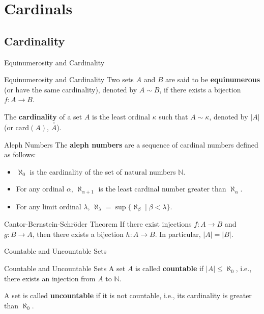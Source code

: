 \chapter{Cardinals} %
\section{Cardinality} %
\begin{leftbarTitle}{Equinumerosity and Cardinality}\end{leftbarTitle} %
\begin{definition}{Equinumerosity and Cardinality} %
    Two sets \(A\) and \(B\) are said to be \textbf{equinumerous} (or have the same cardinality), 
    denoted by \(A \sim B\), if there exists a bijection \(f : A \to B\).
    
    The \textbf{cardinality} of a set \(A\) is the least ordinal \(\kappa\) such that \(A \sim \kappa\),
    denoted by \(|A|\) (or \(\mathrm{card}(A)\), \(\overline{\overline{A}}\)).
\end{definition}


\begin{definition}{Aleph Numbers} %
    The \textbf{aleph numbers} are a sequence of cardinal numbers defined as follows:
    \begin{itemize}
        \item \(\aleph_0\) is the cardinality of the set of natural numbers \(\mathbb{N}\).
        \item For any ordinal \(\alpha\), \(\aleph_{\alpha + 1}\) is the least cardinal number greater than \(\aleph_\alpha\).
        \item For any limit ordinal \(\lambda\), \(\aleph_\lambda = \sup\{\aleph_\beta \mid \beta < \lambda\}\).
    \end{itemize}
\end{definition}

\begin{theorem}{Cantor-Bernstein-Schröder Theorem} %
    If there exist injections \(f : A \to B\) and \(g : B \to A\), 
    then there exists a bijection \(h : A \to B\). In particular, \(|A| = |B|\).
\end{theorem}

\begin{leftbarTitle}{Countable and Uncountable Sets}\end{leftbarTitle} %
\begin{definition}{Countable and Uncountable Sets} %
    A set \(A\) is called \textbf{countable} if \(|A| \leq \aleph_0\), i.e., 
    there exists an injection from \(A\) to \(\mathbb{N}\).

    A set is called \textbf{uncountable} if it is not countable, i.e., its cardinality is greater than \(\aleph_0\).
\end{definition}

